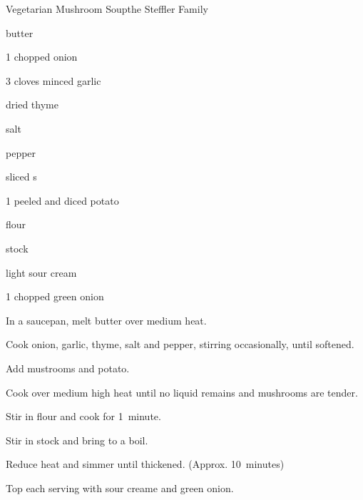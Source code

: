\begin{recipe}{Vegetarian Mushroom Soup}{the Steffler Family}{}

\begin{ingredients}
\item {} butter
\item 1 chopped onion
\item 3 cloves minced garlic
\item \tp{\half} dried thyme
\item \tp{\quarter} salt
\item \tp{\quarter} pepper
\item {} sliced s
\item 1 peeled and diced potato
\item \C{\quarter} flour
\item {} stock
\item \C{\quarter} light sour cream
\item 1 chopped green onion
\end{ingredients}

\begin{directions}
\item In a saucepan, melt butter over medium heat.
\item Cook onion, garlic, thyme, salt and pepper, stirring occasionally, until softened.
\item Add mustrooms and potato.
\item Cook over medium high heat until no liquid remains and mushrooms are tender.
\item Stir in flour and cook for 1~minute.
\item Stir in stock and bring to a boil.
\item Reduce heat and simmer until thickened. (Approx. 10~minutes)
\item Top each serving with sour creame and green onion.
\end{directions}
\end{recipe}
